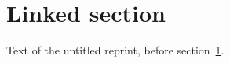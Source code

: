 \documentclass[reprint]{revtex4-2}
\begin{document}
\section{Linked section}\label{sec:linked}
Text of the untitled reprint, before section~\ref{sec:linked}.
\end{document}
